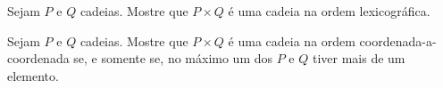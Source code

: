 \begin{exercise}
    Sejam $P$ e $Q$ cadeias. Mostre que $P \times Q$ é uma cadeia na ordem lexicográfica.
\end{exercise}

\begin{exercise}
    Sejam $P$ e $Q$ cadeias. Mostre que $P \times Q$ é uma cadeia na ordem coordenada-a-coordenada se, e somente se, no máximo
    um dos $P$ e $Q$ tiver mais de um elemento.
\end{exercise}